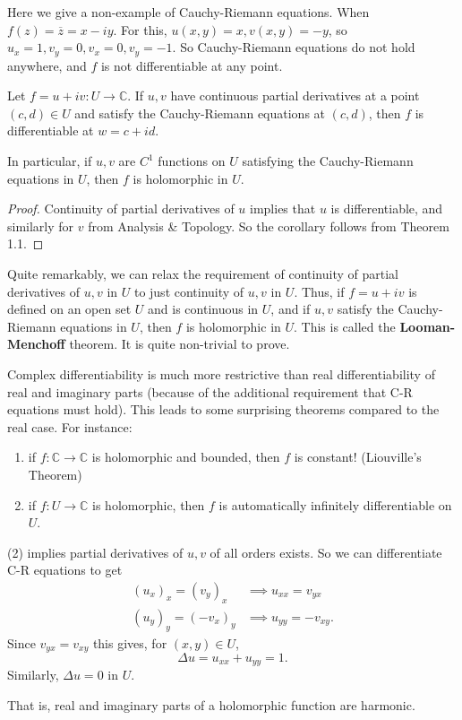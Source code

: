 \leavevmode
\begin{example}
    Here we give a non-example of Cauchy-Riemann equations. When \(f(z) = \overline{z} = x - iy\). For this, \(u(x,y) = x, v(x,y) = -y\), so \(u_x = 1, v_y = 0, v_x = 0, v_y = -1\). So Cauchy-Riemann equations do not hold anywhere, and \(f\) is not differentiable at any point.
\end{example}
\begin{corollary}{}{}
    Let \(f = u + iv: U \to \mathbb{C}\). If \(u, v\) have continuous partial derivatives at a point \((c,d) \in U\) and satisfy the Cauchy-Riemann equations at \((c,d)\), then \(f\) is differentiable at \(w = c + id\).

    In particular, if \(u, v\) are \(C^1\) functions on \(U\) satisfying the Cauchy-Riemann equations in \(U\), then \(f\) is holomorphic in \(U\). 
\end{corollary}
\begin{proof}
    Continuity of partial derivatives of \(u\) implies that \(u\) is differentiable, and similarly for \(v\) from Analysis \& Topology. So the corollary follows from Theorem 1.1.
\end{proof}
\begin{note}
    Quite remarkably, we can relax the requirement of continuity of partial derivatives of \(u,v\) in \(U\) to just continuity of \(u, v\) in \(U\). Thus, if \(f = u + iv\) is defined on an open set \(U\) and is continuous in \(U\), and if \(u, v\) satisfy the Cauchy-Riemann equations in \(U\), then \(f\) is holomorphic in \(U\). This is called the \textbf{Looman-Menchoff} theorem. It is quite non-trivial to prove.
\end{note}
\begin{remark}
    Complex differentiability is much more restrictive than real differentiability of real and imaginary parts (because of the additional requirement that C-R equations must hold). This leads to some surprising theorems compared to the real case. For instance:
    \begin{enumerate}
        \item if \(f: \mathbb{C} \to \mathbb{C}\) is holomorphic and bounded, then \(f\) is constant! (Liouville's Theorem)
        \item if \(f: U\to \mathbb{C}\) is holomorphic, then \( f\) is automatically infinitely differentiable on \(U\).
    \end{enumerate}
\end{remark}
\begin{note}
    (2) implies partial derivatives of \(u, v\) of all orders exists. So we can differentiate C-R equations to get
    \begin{align*}
        (u_x)_x = (v_y)_x &\implies u_{xx} = v_{yx}\\
        (u_y)_y = (-v_x)_y &\implies u_{yy} = -v_{xy}.
    \end{align*}
    Since \(v_{yx} = v_{xy}\) this gives, for \((x,y) \in U\),
    \[
        \Delta u = u_{xx} + u_{yy} = 1.
    \]
    Similarly, \(\Delta u = 0\) in \(U\).

    That is, real and imaginary parts of a holomorphic function are harmonic.
\end{note}
